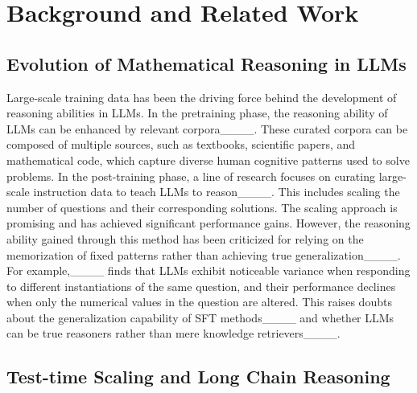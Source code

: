 \section{Background and Related Work}
\subsection{Evolution of Mathematical Reasoning in LLMs}







Large-scale training data has been the driving force behind the development of reasoning abilities in LLMs. In the pretraining phase, the reasoning ability of LLMs can be enhanced by relevant corpora____. These curated corpora can be composed of multiple sources, such as textbooks, scientific papers, and mathematical code, which capture diverse human cognitive patterns used to solve problems. In the post-training phase, a line of research focuses on curating large-scale instruction data to teach LLMs to reason____. This includes scaling the number of questions and their corresponding solutions. The scaling approach is promising and has achieved significant performance gains. However, the reasoning ability gained through this method has been criticized for relying on the memorization of fixed patterns rather than achieving true generalization____. For example,____ finds that LLMs exhibit noticeable variance when responding to different instantiations of the same question, and their performance declines when only the numerical values in the question are altered. This raises doubts about the generalization capability of SFT methods____ and whether LLMs can be true reasoners rather than mere knowledge retrievers____.  



\subsection{Test-time Scaling and Long Chain Reasoning}




